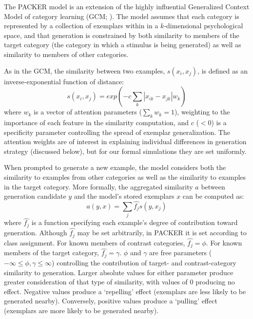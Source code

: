 \documentclass[10pt,letterpaper]{article}
\begin{document}
The PACKER model is an extension of the highly influential Generalized Context Model of category learning (GCM; \citealp{nosofsky1984choice}). The model assumes that each category is represented by a collection of exemplars within in a $k$-dimensional psychological space, and that generation is constrained by both similarity to members of the target category (the category in which a stimulus is being generated) as well as similarity to members of other categories. 

As in the GCM, the similarity between two examples, $s(x_i, x_j)$, is defined as an inverse-exponential function of distance:
\begin{equation}
  s(x_i,x_j) = exp( -c \sum_{k}{|x_{ik} - x_{jk}|}w_k )
  \label{eq:similarity}
\end{equation}
where $w_k$ is a vector of attention parameters ($\sum_k{w_k} = 1$), weighting to the importance of each feature in the similarity computation, and $c$ ($<0$) is a specificity parameter controlling the spread of exemplar generalization. The attention weights are of interest in explaining individual differences in generation strategy (discussed below), but for our formal simulations they are set uniformly.


When prompted to generate a new example, the model considers both the similarity to examples from other categories as well as the similarity to examples in the target category. More formally, the aggregated similarity $a$ between generation candidate $y$ and the model's stored exemplars $x$ can be computed as:
\begin{equation}
  a(y, x) = \sum_j{\hat{f_j} s(y, x_j)}
  \label{eq:packer-ss}
\end{equation}
where $\hat{f_j}$ is a function specifying each example's degree of contribution toward generation. Although $\hat{f_j}$ may be set arbitrarily, in PACKER it is set according to class assignment. For known members of contrast categories, $\hat{f_j} = \phi$. For known members of the target category, $\hat{f_j} = \gamma$. $\phi$ and $\gamma$ are free parameters ($-\infty \leq \phi, \gamma \leq \infty$) controlling the contribution of target- and contrast-category similarity to generation. Larger absolute values for either parameter produce greater consideration of that type of similarity, with values of 0 producing no effect. Negative values produce a `repelling' effect (exemplars are less likely to be generated nearby). Conversely, positive values produce a `pulling' effect (exemplars are more likely to be generated nearby). 
\end{document}
